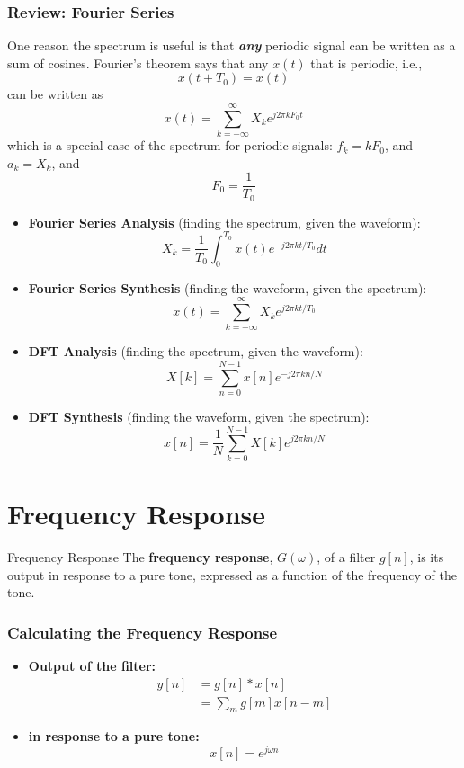 \documentclass{beamer}
\begin{document}
\begin{frame}
  \frametitle{Review: Fourier Series}

  One reason the spectrum is useful is that {\bf\em any} periodic
  signal can be written as a sum of cosines.  Fourier's theorem says that
  any $x(t)$ that is periodic, i.e.,
  \[
  x(t+T_0) = x(t)
  \]
  can be written as
  \[
  x(t) = \sum_{k=-\infty}^\infty X_k e^{j2\pi k F_0 t}
  \]
  which is a special case of the spectrum for periodic signals:
  $f_k=kF_0$, and $a_k=X_k$, and
  \[
  F_0 = \frac{1}{T_0}
  \]
\end{frame}

\begin{frame}
  \begin{itemize}
  \item {\bf Fourier Series Analysis}  (finding the spectrum, given the waveform):
    \[
    X_k = \frac{1}{T_0}\int_0^{T_0} x(t)e^{-j2\pi kt/T_0}dt
    \]
  \item {\bf Fourier Series Synthesis}  (finding the waveform, given the spectrum):
    \[
    x(t) = \sum_{k=-\infty}^\infty X_k e^{j2\pi kt/T_0}
    \]
  \item {\bf DFT Analysis}  (finding the spectrum, given the waveform):
    \[
    X[k] = \sum_{n=0}^{N-1} x[n]e^{-j2\pi kn/N}
    \]
  \item {\bf DFT Synthesis} (finding the waveform, given the spectrum):
    \[
    x[n] = \frac{1}{N}\sum_{k=0}^{N-1} X[k] e^{j2\pi kn/N}
    \]
  \end{itemize}
\end{frame}  

\section[Frequency Response]{Frequency Response}
\setcounter{subsection}{1}

\begin{frame}
  \begin{block}{Frequency Response}
    The {\bf frequency response}, $G(\omega)$, of a filter $g[n]$, is
    its output in response to a pure tone, expressed as a function of
    the frequency of the tone.
  \end{block}
\end{frame}

\begin{frame}
  \frametitle{Calculating the Frequency Response}
  \begin{itemize}
  \item {\bf Output of the filter:}
    \begin{align*}
      y[n] &= g[n]\ast x[n]\\
      &= \sum_m g[m] x[n-m]
    \end{align*}
  \item {\bf in response to a pure tone:}
    \[
    x[n] = e^{j\omega n}
    \]
  \end{itemize}
\end{frame}
\end{document}
